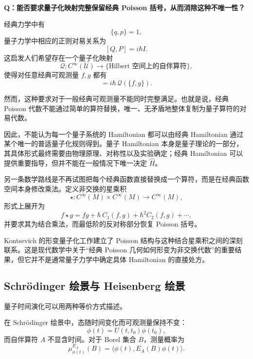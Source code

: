 \documentclass[UTF8,a4paper,11pt,openany]{ctexbook}
\begin{document}
\textbf{Q：能否要求量子化映射完整保留经典 Poisson 括号，从而消除这种不唯一性？}

经典力学中有
\[
\{q,p\}=1,
\]
量子力学中相应的正则对易关系为
\[
[Q,P]=i\hbar I.
\]
这启发人们希望存在一个量子化映射
\[
\mathcal Q:C^\infty(\mathcal U)\longrightarrow
\{\text{Hilbert 空间上的自伴算符}\},
\]
使得对任意经典可观测量 $f,g$ 都有
\begin{equation}
    [\mathcal Q(f),\mathcal Q(g)]
    =
    i\hbar\,\mathcal Q(\{f,g\}).
\end{equation}

然而，这种要求对于一般经典可观测量不能同时完整满足。也就是说，经典 Poisson 代数不能通过简单的算符替换，唯一、无矛盾地整体复制为量子算符的对易代数。

因此，不能认为每一个量子系统的 Hamiltonian 都可以由经典 Hamiltonian 通过某个唯一的普适量子化规则得到。量子 Hamiltonian 本身是量子理论的一部分，其具体形式最终需要由物理原理、对称性以及实验确定；经典 Hamiltonian 可以提供重要指导，但并不能在一般情况下唯一决定 $\hat H$。

\begin{tcolorbox}[
    enhanced,
    breakable,
    colback=white,
    colframe=black!45,
    boxrule=0.7pt,
    arc=1mm,
    left=2mm,
    right=2mm,
    top=1.5mm,
    bottom=1.5mm,
    title={数学补充：形变量子化},
    fonttitle=\bfseries
]
另一条数学路线是不再试图把每个经典函数直接替换成一个算符，而是在经典函数空间本身修改乘法。定义非交换的星乘积
\[
\star:
C^\infty(M)\times C^\infty(M)
\longrightarrow C^\infty(M),
\]
形式上展开为
\begin{equation}
    f\star g
    =
    fg+\hbar\,C_1(f,g)+\hbar^2C_2(f,g)+\cdots,
\end{equation}
并要求其为结合乘法，而最低阶的反对称部分恢复 Poisson 括号。

Kontsevich 的形变量子化工作建立了 Poisson 结构与这种结合星乘积之间的深刻联系。这是现代数学中关于“经典 Poisson 几何如何形变为非交换代数”的重要结果，但它并不是通常量子力学中确定具体 Hamiltonian 的直接处方。
\end{tcolorbox}

\subsection{Schrödinger 绘景与 Heisenberg 绘景}

量子时间演化可以用两种等价方式描述。

在 Schrödinger 绘景中，态随时间变化而可观测量保持不变：
\[
\phi(t)=U(t,t_0)\phi(t_0),
\]
而自伴算符 $A$ 不显含时间。对于 Borel 集合 $B$，测量概率为
\begin{equation}
    \mu_{\phi(t)}^{E_A}(B)
    =
    \langle\phi(t),E_A(B)\phi(t)\rangle.
\end{equation}
\end{document}

